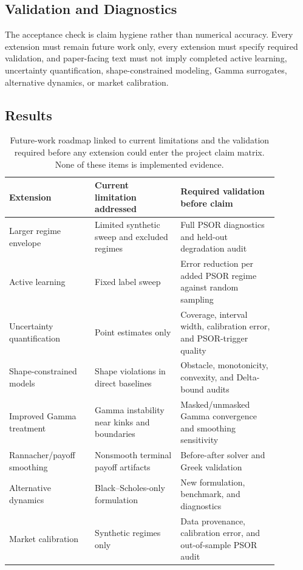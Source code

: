 \documentclass[11pt]{article}
\begin{document}
\subsection{Validation and Diagnostics}
The acceptance check is claim hygiene rather than numerical accuracy. Every extension must remain future work only, every extension must specify required validation, and paper-facing text must not imply completed active learning, uncertainty quantification, shape-constrained modeling, Gamma surrogates, alternative dynamics, or market calibration.

\subsection{Results}
\begin{table}[h]
\centering
\small
\begin{tabular}{p{0.28\linewidth}p{0.28\linewidth}p{0.32\linewidth}}
\toprule
Extension & Current limitation addressed & Required validation before claim \\
\midrule
Larger regime envelope & Limited synthetic sweep and excluded regimes & Full PSOR diagnostics and held-out degradation audit \\
Active learning & Fixed label sweep & Error reduction per added PSOR regime against random sampling \\
Uncertainty quantification & Point estimates only & Coverage, interval width, calibration error, and PSOR-trigger quality \\
Shape-constrained models & Shape violations in direct baselines & Obstacle, monotonicity, convexity, and Delta-bound audits \\
Improved Gamma treatment & Gamma instability near kinks and boundaries & Masked/unmasked Gamma convergence and smoothing sensitivity \\
Rannacher/payoff smoothing & Nonsmooth terminal payoff artifacts & Before-after solver and Greek validation \\
Alternative dynamics & Black--Scholes-only formulation & New formulation, benchmark, and diagnostics \\
Market calibration & Synthetic regimes only & Data provenance, calibration error, and out-of-sample PSOR audit \\
\bottomrule
\end{tabular}
\caption{Future-work roadmap linked to current limitations and the validation required before any extension could enter the project claim matrix. None of these items is implemented evidence.}
\end{table}
\end{document}
